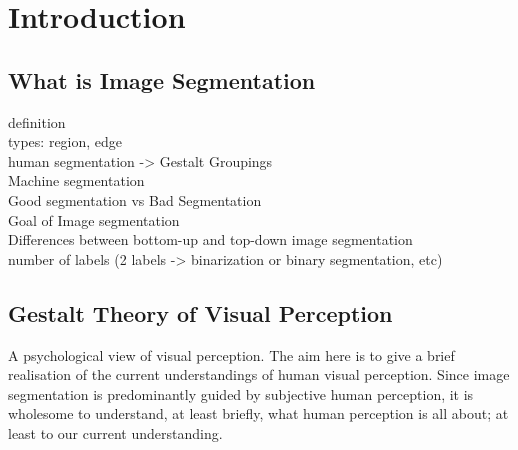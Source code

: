
\chapter{Introduction} %

\label{chap:Chapter1} %


\newcommand{\keyword}[1]{\textbf{#1}}
\newcommand{\tabhead}[1]{\textbf{#1}}
\newcommand{\code}[1]{\texttt{#1}}
\newcommand{\file}[1]{\texttt{\bfseries#1}}
\newcommand{\option}[1]{\texttt{\itshape#1}}


\section{What is Image Segmentation}

definition\\
types: region, edge\\
human segmentation -> Gestalt Groupings\\
Machine segmentation\\
Good segmentation vs Bad Segmentation\\
Goal of Image segmentation\\
Differences between bottom-up and top-down image segmentation\\
number of labels (2 labels -> binarization or binary segmentation, etc)


\section{Gestalt Theory of Visual Perception}

A psychological view of visual perception. The aim here is to give a brief realisation of the current understandings of human visual perception. Since image segmentation is predominantly guided by subjective human perception, it is wholesome to understand, at least briefly, what human perception is all about; at least to our current understanding.


